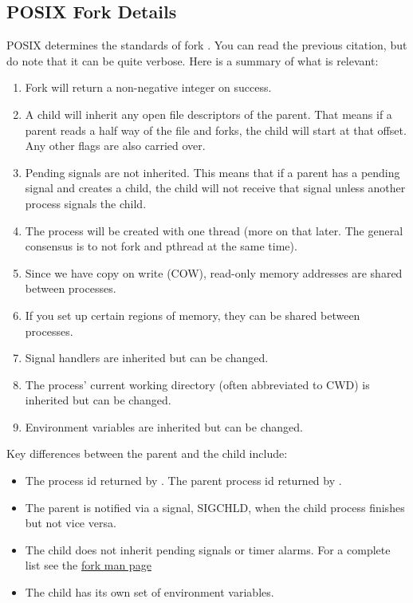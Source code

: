 \subsection{POSIX Fork Details}

POSIX determines the standards of fork \cite{fork_2018}.
You can read the previous citation, but do note that it can be quite verbose.
Here is a summary of what is relevant:

\begin{enumerate}
    \item Fork will return a non-negative integer on success.
    \item A child will inherit any open file descriptors of the parent.
          That means if a parent reads a half way of the file and forks, the child will start at that offset.
          Any other flags are also carried over.
    \item Pending signals are not inherited.
          This means that if a parent has a pending signal and creates a child, the child will not receive that signal unless another process signals the child.
    \item The process will be created with one thread (more on that later. The general consensus is to not fork and pthread at the same time).
    \item Since we have copy on write (COW), read-only memory addresses are shared between processes.
    \item If you set up certain regions of memory, they can be shared between processes.
    \item Signal handlers are inherited but can be changed.
    \item The process' current working directory (often abbreviated to CWD) is inherited but can be changed.
    \item Environment variables are inherited but can be changed.
\end{enumerate}

Key differences between the parent and the child include:
\begin{itemize}
    \item The process id returned by .
          The parent process id returned by .
    \item The parent is notified via a signal, SIGCHLD, when the child process finishes but not vice versa.
    \item The child does not inherit pending signals or timer alarms.
          For a complete list see the \href{http://man7.org/linux/man-pages/man2/fork.2.html}{fork man page}
    \item The child has its own set of environment variables.
\end{itemize}

